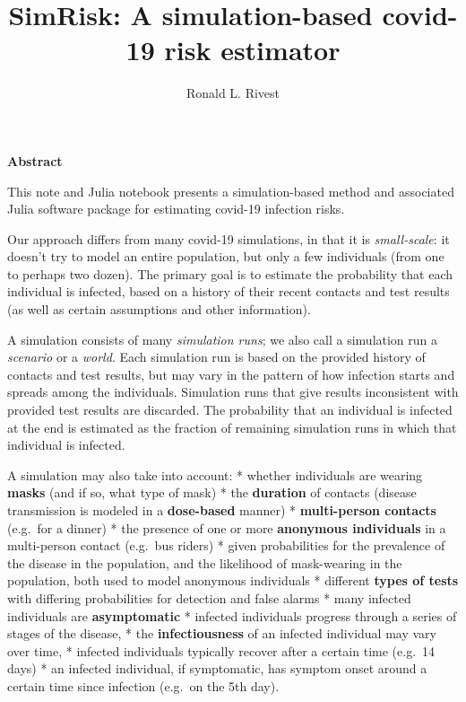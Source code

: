 \documentclass[11pt]{article}
\title{SimRisk: A simulation-based covid-19 risk estimator}
\author{Ronald L. Rivest}
\begin{document}
    
    \maketitle
    
    

    
    \textbf{Abstract}

This note and Julia notebook presents a simulation-based method and
associated Julia software package for estimating covid-19 infection
risks.

Our approach differs from many covid-19 simulations, in that it is
\emph{small-scale}: it doesn't try to model an entire population, but
only a few individuals (from one to perhaps two dozen). The primary goal
is to estimate the probability that each individual is infected, based
on a history of their recent contacts and test results (as well as
certain assumptions and other information).

A simulation consists of many \emph{simulation runs}; we also call a
simulation run a \emph{scenario} or a \emph{world}. Each simulation run
is based on the provided history of contacts and test results, but may
vary in the pattern of how infection starts and spreads among the
individuals. Simulation runs that give results inconsistent with
provided test results are discarded. The probability that an individual
is infected at the end is estimated as the fraction of remaining
simulation runs in which that individual is infected.

A simulation may also take into account: * whether individuals are
wearing \textbf{masks} (and if so, what type of mask) * the
\textbf{duration} of contacts (disease transmission is modeled in a
\textbf{dose-based} manner) * \textbf{multi-person contacts} (e.g.~for a
dinner) * the presence of one or more \textbf{anonymous individuals} in
a multi-person contact (e.g.~bus riders) * given probabilities for the
prevalence of the disease in the population, and the likelihood of
mask-wearing in the population, both used to model anonymous individuals
* different \textbf{types of tests} with differing probabilities for
detection and false alarms * many infected individuals are
\textbf{asymptomatic} * infected individuals progress through a series
of stages of the disease, * the \textbf{infectiousness} of an infected
individual may vary over time, * infected individuals typically recover
after a certain time (e.g.~14 days) * an infected individual, if
symptomatic, has symptom onset around a certain time since infection
(e.g.~on the 5th day).
\end{document}
